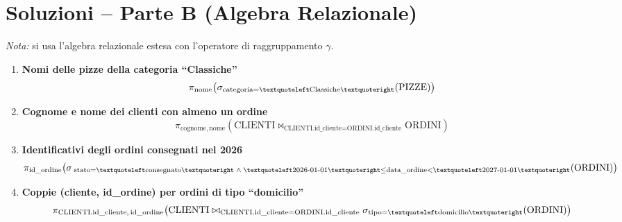 \documentclass[a4paper,12pt]{article}
\begin{document}
	\section*{Soluzioni -- Parte B (Algebra Relazionale)}
	
	\textit{Nota:} si usa l'algebra relazionale estesa con l'operatore di raggruppamento $\gamma$.
	
	\begin{enumerate}
		
		\item \textbf{Nomi delle pizze della categoria ``Classiche''}
		\[
		\pi_{\text{nome}}\!\left(
		\sigma_{\text{categoria}=\textquoteleft\text{Classiche}\textquoteright}(\text{PIZZE})
		\right)
		\]
		
		\item \textbf{Cognome e nome dei clienti con almeno un ordine}
		\[
		\pi_{\text{cognome},\,\text{nome}}\!\left(
		\text{CLIENTI}
		\bowtie_{\text{CLIENTI.id\_cliente}=\text{ORDINI.id\_cliente}}
		\text{ORDINI}
		\right)
		\]
		
		\item \textbf{Identificativi degli ordini consegnati nel 2026}
		\[
		\pi_{\text{id\_ordine}}\!\left(
		\sigma_{\;
			\text{stato}=\textquoteleft\text{consegnato}\textquoteright
			\;\wedge\;
			\textquoteleft\text{2026-01-01}\textquoteright \le \text{data\_ordine}
			< \textquoteleft\text{2027-01-01}\textquoteright
		}(\text{ORDINI})
		\right)
		\]
		
		
		\item \textbf{Coppie (cliente, id\_ordine) per ordini di tipo ``domicilio''}
		\[
		\pi_{\text{CLIENTI.id\_cliente},\,\text{id\_ordine}}\!\left(
		\text{CLIENTI}
		\bowtie_{\text{CLIENTI.id\_cliente}=\text{ORDINI.id\_cliente}}
		\sigma_{\text{tipo}=\textquoteleft\text{domicilio}\textquoteright}(\text{ORDINI})
		\right)
		\]
		
	\end{enumerate}
	
\end{document}
